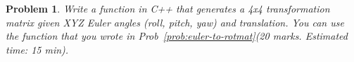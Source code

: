 \documentclass[twocolumn]{article}
\newtheorem{prob}{Problem}
\newif\ifsol
\begin{document}
\ifsol
\paragraph*{Solution}
Please check function \verb|euler_to_rotmat| and \verb|rotmat_to_euler_rpy| in \verb|hw1.cpp|
\fi

\begin{prob}
  Write a function in C++ that generates a 4x4 transformation matrix given XYZ Euler
  angles (roll, pitch, yaw) and translation. You can use the function that you
  wrote in Prob~\ref{prob:euler-to-rotmat}(20 marks. Estimated time: 15 min).
\end{prob}

\ifsol
\paragraph*{Solution}
Please check function \verb|transformation_matrix| in \verb|hw1.cpp|
\fi


%
%
\end{document}
